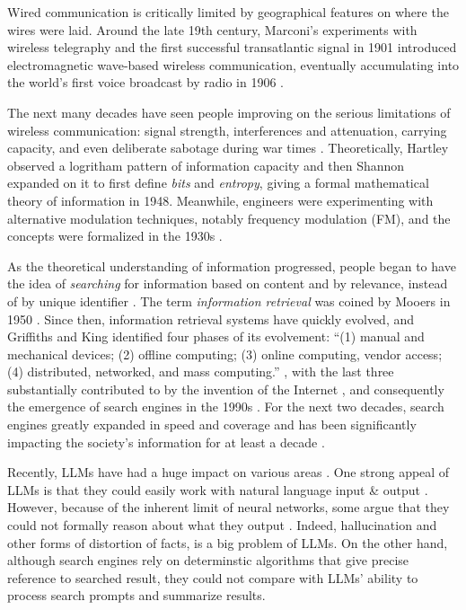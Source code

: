 \documentclass[project-plan]{report-template}
\begin{document}
Wired communication is critically limited by geographical
features on where the wires were laid. Around the late 19th century, 
Marconi's experiments with wireless telegraphy \cite{history.wireless.1} and
the first successful transatlantic signal in 1901
\cite{history.first.atlantic.broadcast} introduced electromagnetic wave-based
wireless communication, eventually accumulating into the world's first voice
broadcast by radio in 1906 \cite{first.voice.broadcast}. 

The next many decades have seen people improving on the serious limitations of
wireless communication: signal strength, interferences and attenuation,
carrying capacity, and even deliberate sabotage during war times
\cite{wireless.weakness.1, wireless.weakness.2, wireless.weakness.3}.
Theoretically, Hartley observed a logritham pattern of information capacity
\cite{hartley.log.information} and then Shannon expanded on it to first define
\emph{bits} and \emph{entropy}, giving a formal mathematical theory of
information \cite{shannon.theory.communication} in 1948. Meanwhile,
engineers were experimenting with alternative modulation techniques, notably
frequency modulation (FM), and the concepts were formalized in the 1930s
\cite{history.modulation}. 

As the theoretical understanding of information progressed, people began to
have the idea of \emph{searching} for information based on content
and by relevance, instead of by unique identifier
\cite{history.information.retrieval}. The term \emph{information
retrieval} was coined by Mooers in 1950
\cite{mooers.info.ret.term}. Since then, information retrieval systems have
quickly evolved, and Griffiths and King identified four phases of its
evolvement: ``(1) manual and mechanical
devices; (2) offline computing; (3) online computing, vendor access; (4)
distributed, networked, and mass computing.'' \cite{info.ret.4.phases}, with
the last three substantially contributed to by the invention of the Internet
\cite{history.internet}, and consequently the emergence of search engines in
the 1990s \cite{history.search.engines, history.internet.search.engines}.
For the next two decades, search engines greatly expanded in speed and
coverage and has been significantly impacting the society's information for at
least a decade \cite{search.engine.impact.1, search.engine.impact.2}.

Recently, LLMs have had a huge impact on various areas \cite{llm.impact.1}. One
strong appeal of LLMs is that they could easily work with natural language
input \& output \cite{llm.power.1, llm.power.2}. However, because of the
inherent limit of neural networks, some argue that they could not formally
reason about what they output \cite{llm.limit.1, llm.limit.2, llm.limit.3}.
Indeed, hallucination \cite{llm.hallucination.1, llm.hallucination.2} and other
forms of distortion of facts, is a big problem of LLMs. On the other hand,
although search engines rely on determinstic algorithms that give precise
reference to searched result, they could not compare with LLMs' ability to
process search prompts and summarize results. 
\end{document}
